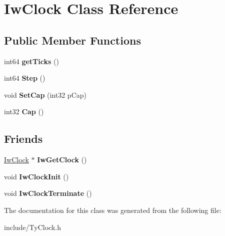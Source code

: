 \hypertarget{class_iw_clock}{
\section{IwClock Class Reference}
\label{class_iw_clock}
}
\subsection*{Public Member Functions}
\begin{DoxyCompactItemize}
\item 
\hypertarget{class_iw_clock_a564661eb2cde827f66b9598626ac7327}{
int64 {\bfseries getTicks} ()}
\label{class_iw_clock_a564661eb2cde827f66b9598626ac7327}

\item 
\hypertarget{class_iw_clock_a7b426dd93cb168751ec5ff56e9adac77}{
int64 {\bfseries Step} ()}
\label{class_iw_clock_a7b426dd93cb168751ec5ff56e9adac77}

\item 
\hypertarget{class_iw_clock_a4078000fbee8dd5a213f9f13fa612624}{
void {\bfseries SetCap} (int32 pCap)}
\label{class_iw_clock_a4078000fbee8dd5a213f9f13fa612624}

\item 
\hypertarget{class_iw_clock_a531ee1a242c06c793c0b8eb2067a284e}{
int32 {\bfseries Cap} ()}
\label{class_iw_clock_a531ee1a242c06c793c0b8eb2067a284e}

\end{DoxyCompactItemize}
\subsection*{Friends}
\begin{DoxyCompactItemize}
\item 
\hypertarget{class_iw_clock_a001f2a4d48cb5b9ae4b3c11eebb7d8a2}{
\hyperlink{class_iw_clock}{IwClock} $\ast$ {\bfseries IwGetClock} ()}
\label{class_iw_clock_a001f2a4d48cb5b9ae4b3c11eebb7d8a2}

\item 
\hypertarget{class_iw_clock_a6472b855774c1c0dd938a544509aa288}{
void {\bfseries IwClockInit} ()}
\label{class_iw_clock_a6472b855774c1c0dd938a544509aa288}

\item 
\hypertarget{class_iw_clock_a5a79c75d7b979ef259ea87947d20305f}{
void {\bfseries IwClockTerminate} ()}
\label{class_iw_clock_a5a79c75d7b979ef259ea87947d20305f}

\end{DoxyCompactItemize}


The documentation for this class was generated from the following file:\begin{DoxyCompactItemize}
\item 
include/TyClock.h\end{DoxyCompactItemize}
